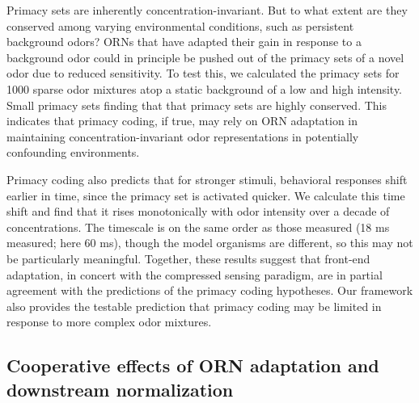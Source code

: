 Primacy sets are inherently concentration-invariant. But to what extent are they conserved among varying environmental conditions, such as persistent background odors? ORNs that have adapted their gain in response to a background odor could in principle be pushed out of the primacy sets of a novel odor due to reduced sensitivity. To test this, we calculated the primacy sets for 1000  sparse odor mixtures atop a static background of a low and high intensity. Small primacy sets finding that that primacy sets are highly conserved. This indicates that primacy coding, if true, may rely on ORN  adaptation in maintaining concentration-invariant odor representations in potentially confounding environments.




Primacy coding also predicts that for stronger stimuli, behavioral responses shift earlier in time, since the primacy set is activated quicker. We calculate this time shift and find that it rises monotonically with odor intensity over a decade of concentrations.  The timescale is on the same order as those measured (18 ms measured; here 60 ms), though the model organisms are different, so this may not be particularly meaningful. Together, these results suggest that front-end adaptation, in concert with the compressed sensing paradigm, are in partial agreement with the predictions of the primacy coding hypotheses. Our framework also provides the testable prediction that primacy coding may be limited in response to more complex odor mixtures.

\subsection{Cooperative effects of ORN adaptation and  downstream normalization}


